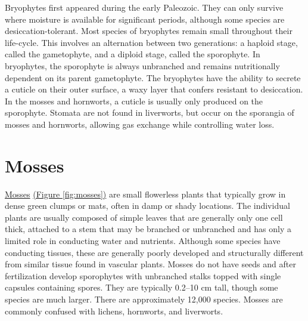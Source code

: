 Bryophytes first appeared during the early Paleozoic. They can only
survive where moisture is available for significant periods, although
some species are desiccation-tolerant. Most species of bryophytes remain
small throughout their life-cycle. This involves an alternation between
two generations: a haploid stage, called the gametophyte, and a diploid
stage, called the sporophyte. In bryophytes, the sporophyte is always
unbranched and remains nutritionally dependent on its parent
gametophyte. The bryophytes have the ability to secrete a cuticle on
their outer surface, a waxy layer that confers resistant to desiccation.
In the mosses and hornworts, a cuticle is usually only produced on the
sporophyte. Stomata are not found in liverworts, but occur on the
sporangia of mosses and hornworts, allowing gas exchange while
controlling water loss.

\section{Mosses}\label{mosses}

\href{https://en.wikipedia.org/wiki/Moss}{Mosses}
\href{https://commons.wikimedia.org/wiki/File:Haeckel_Muscinae.jpg}{(Figure
\ref{fig:mosses})} are small flowerless plants that typically grow in
dense green clumps or mats, often in damp or shady locations. The
individual plants are usually composed of simple leaves that are
generally only one cell thick, attached to a stem that may be branched
or unbranched and has only a limited role in conducting water and
nutrients. Although some species have conducting tissues, these are
generally poorly developed and structurally different from similar
tissue found in vascular plants. Mosses do not have seeds and after
fertilization develop sporophytes with unbranched stalks topped with
single capsules containing spores. They are typically 0.2--10 cm tall,
though some species are much larger. There are approximately 12,000
species. Mosses are commonly confused with lichens, hornworts, and
liverworts.

